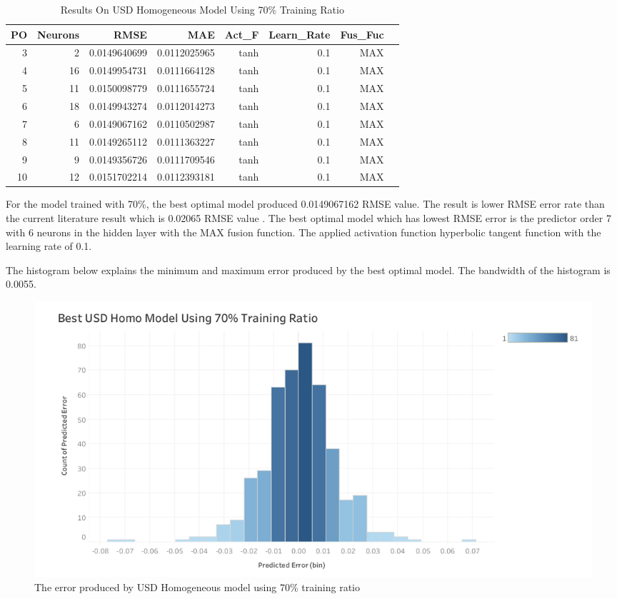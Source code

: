 {{\begin{table}[ht]
	\centering
	\begin{tabular}{@{}rrrrrrrr@{}}
		\toprule
		\textbf{PO}&\textbf{Neurons}& \textbf{RMSE} & \textbf{MAE} & \textbf{Act\_F}  & \textbf{Learn\_Rate} &\textbf{ Fus\_Fuc}\\ 
		\midrule
		 3 & 2 & 0.0149640699 & 0.0112025965 & tanh & 0.1 & MAX \\ 
		 4 & 16 & 0.0149954731 & 0.0111664128 & tanh & 0.1 & MAX \\ 
		 5 & 11 & 0.0150098779 & 0.0111655724 & tanh & 0.1 & MAX \\ 
		 6 & 18 & 0.0149943274 & 0.0112014273 & tanh & 0.1 & MAX \\ 
		 7 & 6 & 0.0149067162 & 0.0110502987 & tanh & 0.1 & MAX \\ 
		 8 & 11 & 0.0149265112 & 0.0111363227 & tanh & 0.1 & MAX \\ 
		 9 & 9 & 0.0149356726 & 0.0111709546 & tanh & 0.1 & MAX \\ 
		 10 & 12 & 0.0151702214 & 0.0112393181 & tanh & 0.1& MAX \\ 
		 
		\hline
	\end{tabular}
	\hspace*{1cm}
	\caption{Results On USD Homogeneous Model Using 70\% Training Ratio }
\end{table}

For the model trained with 70\%,  the best optimal model produced 0.0149067162 RMSE value. The result is lower RMSE error rate than the current literature result which is 0.02065 RMSE value \cite{chan:2010}. The best optimal model which has lowest RMSE error is the predictor order 7 with 6 neurons in the hidden layer with the MAX fusion function. The applied activation function hyperbolic tangent function with the learning rate of 0.1.

The histogram below explains the minimum and maximum error produced by the best optimal model. The bandwidth of the histogram is 0.0055.

\begin{figure}[hbt!]\centering
	\includegraphics[width=1\textwidth]{homo_usd_70}
	\caption{The error produced by USD Homogeneous model  using 70\% training ratio}
\end{figure}


}}
